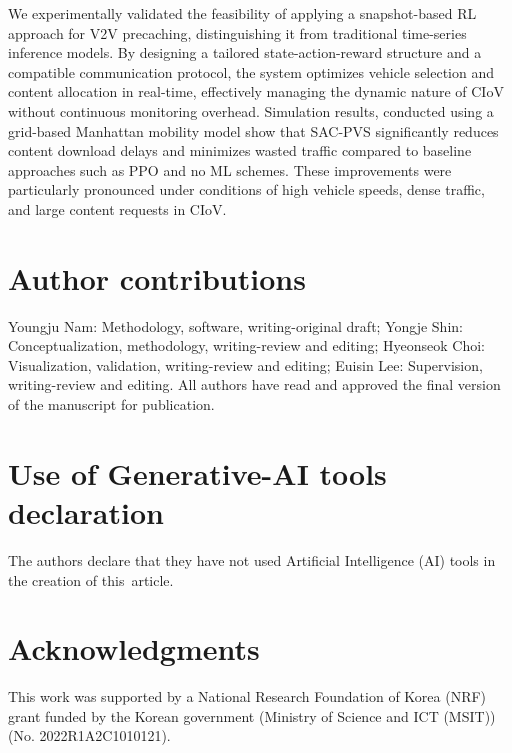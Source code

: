 \documentclass{aims}
\numberwithin{equation}{section}
\begin{document}
We experimentally validated the feasibility of applying a snapshot-based RL approach for V2V precaching, distinguishing it from traditional time-series inference models.
By designing a tailored state-action-reward structure and a compatible communication protocol, the system optimizes vehicle selection and content allocation in real-time, effectively managing the dynamic nature of CIoV without continuous monitoring overhead.
Simulation results, conducted using a grid-based Manhattan mobility model show that SAC-PVS significantly reduces content download delays and minimizes wasted traffic compared to baseline approaches such as PPO and no ML schemes.
These improvements were particularly pronounced under conditions of high vehicle speeds, dense traffic, and large content requests in CIoV.


\section*{Author contributions}
Youngju Nam: Methodology, software, writing-original draft; Yongje Shin: Conceptualization, methodology, writing-review and editing; Hyeonseok Choi: Visualization, validation, writing-review and editing; Euisin Lee: Supervision, writing-review and editing. All authors have read and approved the final version of the manuscript for publication.

\section*{Use of Generative-AI tools declaration}
The authors declare that they have not used Artificial Intelligence (AI) tools in the creation of this~article.

\section*{Acknowledgments}
This work was supported by a National Research Foundation of Korea (NRF) grant funded by the Korean government (Ministry of Science and ICT (MSIT)) (No. 2022R1A2C1010121).
\end{document}
